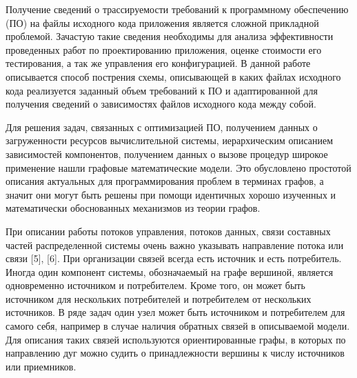 



Получение сведений о трассируемости требований к программному обеспечению (ПО) на файлы исходного кода приложения является сложной прикладной проблемой. Зачастую такие сведения необходимы для анализа эффективности проведенных работ по проектированию приложения, оценке стоимости его тестирования, а так же управления его конфигурацией. В данной работе описывается способ пострения схемы, описывающей в каких файлах исходного кода реализуется заданный объем требований к ПО и адаптированной для получения сведений о зависимостях файлов исходного кода между собой.

Для решения задач, связанных с оптимизацией ПО, получением данных о загруженности ресурсов вычислительной системы, иерархическим описанием зависимостей компонентов, получением данных о вызове процедур широкое применение нашли графовые математические модели. Это обусловлено простотой описания актуальных для программирования проблем в терминах графов, а значит они могут быть решены при помощи идентичных хорошо изученных и математически обоснованных механизмов из теории графов.

При описании работы потоков управления, потоков данных, связи составных частей распределенной системы очень важно указывать направление потока или связи [5], [6]. При организации связей всегда есть источник и есть потребитель. Иногда один компонент системы, обозначаемый на графе вершиной, является одновременно источником и потребителем. Кроме того, он может быть источником для нескольких потребителей и потребителем от нескольких источников. В ряде задач один узел может быть источником и потребителем для самого себя, например в случае наличия обратных связей в описываемой модели. Для описания таких связей используются ориентированные графы, в которых по направлению дуг можно судить о принадлежности вершины к числу источников или приемников.

